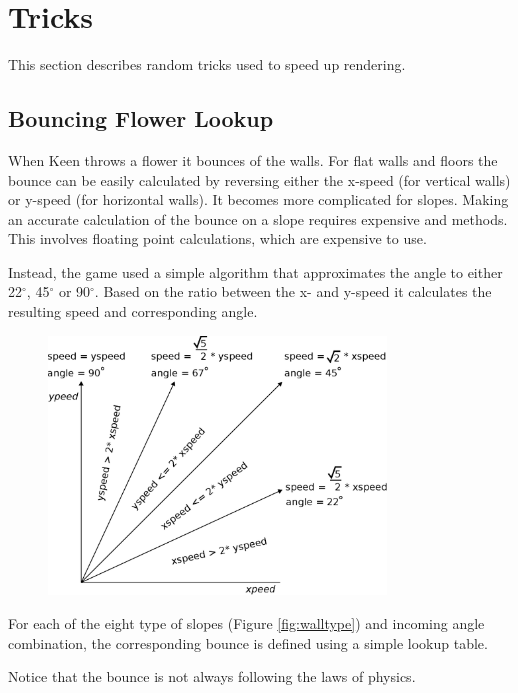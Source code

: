 \documentclass[book.tex]{subfiles}
\begin{document}
\section{Tricks}

This section describes random tricks used to speed up rendering. 




\subsection{Bouncing Flower Lookup}
When Keen throws a flower it bounces of the walls. For flat walls and floors the bounce can be easily calculated by reversing either the x-speed (for vertical walls) or y-speed (for horizontal walls). It becomes more complicated for slopes. Making an accurate calculation of the bounce on a slope requires expensive  and  methods. This involves floating point calculations, which are expensive to use. \\
\par
Instead, the game used a simple algorithm that approximates the angle to either 22$^{\circ}$, 45$^{\circ}$ or 90$^{\circ}$. Based on the ratio between the x- and y-speed it calculates the resulting speed and corresponding angle.\\
\par
\begin{figure}[H]
\centering
\includegraphics[width=0.8\textwidth]{imgs/drawings/angle.eps}
\label{fig:angles}
\end{figure}
\par
For each of the eight type of slopes (Figure \ref{fig:walltype}) and incoming angle combination, the corresponding bounce is defined using a simple lookup table.\\

\par
Notice that the bounce is not always following the laws of physics. 
\end{document}

